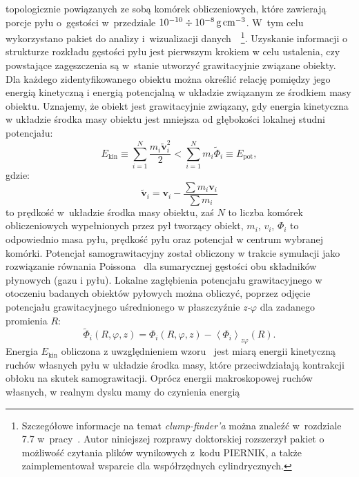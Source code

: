 topologicznie powiązanych ze sobą komórek obliczeniowych, które zawierają porcje
pyłu o~gęstości w~przedziale $10^{-10}\div10^{-8}\hbox{$\thinspace\textrm{g}$}\hbox{$\thinspace\textrm{cm}$}^{-3}$. W~tym celu
wykorzystano pakiet do analizy i~wizualizacji danych~\yt{}~\footnote{Szczegółowe
informacje na temat \emph{clump-finder'a} można znaleźć w~rozdziale 7.7
w~pracy~\cite{yt}. Autor niniejszej rozprawy doktorskiej rozszerzył pakiet
\yt{} o możliwość czytania plików wynikowych z~kodu PIERNIK, a także
zaimplementował wsparcie dla współrzędnych cylindrycznych.}.  Uzyskanie
informacji o strukturze rozkładu gęstości pyłu jest pierwszym krokiem w celu
ustalenia, czy powstające zagęszczenia są w~stanie utworzyć grawitacyjnie
związane obiekty. Dla każdego zidentyfikowanego obiektu można określić relację
pomiędzy jego energią kinetyczną i energią potencjalną w układzie związanym ze
środkiem masy obiektu. Uznajemy, że obiekt jest grawitacyjnie związany, gdy
energia kinetyczna w układzie środka masy obiektu jest mniejsza od głębokości
lokalnej studni potencjału:
%
\begin{equation}
   \label{eq:bcrit}
   E_{\textrm{kin}} \equiv \sum\limits_{i=1}^N \frac{m_i\tilde{\mathbf{v}}_i^2}{2} 
   < \sum\limits_{i=1}^N m_i\tilde{\Phi}_i \equiv E_{\textrm{pot}},
\end{equation}
%
gdzie:
\begin{equation}
   \tilde{\mathbf{v}}_i = \mathbf{v}_i - \frac{\sum m_i \mathbf{v}_i}{\sum m_i}
   \label{eq:velcom}
\end{equation}
to prędkość w~układzie środka masy obiektu, zaś $N$ to liczba komórek
obliczeniowych wypełnionych przez pył tworzący obiekt, $m_i$, $v_i$, $\Phi_i$ to
odpowiednio masa pyłu, prędkość pyłu oraz potencjał w centrum wybranej komórki. Potencjał
samograwitacyjny został obliczony w trakcie symulacji jako rozwiązanie
równania Poissona~ dla sumarycznej gęstości obu składników
płynowych (gazu i pyłu).  Lokalne zagłębienia potencjału grawitacyjnego w
otoczeniu badanych obiektów pyłowych można obliczyć, poprzez odjęcie potencjału
grawitacyjnego uśrednionego w płaszczyźnie \emph{z-$\varphi$} dla zadanego
promienia $R$:
%
\begin{equation}
   \tilde{\Phi}_i(R,\varphi,z) = \Phi_i(R,\varphi,z) -
   \left<\Phi_i\right>_{z\varphi}(R).
\end{equation}
%
Energia $E_{\textrm{kin}}$ obliczona z uwzględnieniem wzoru~
jest miarą energii kinetyczną ruchów własnych pyłu w układzie środka masy, które
przeciwdziałają kontrakcji obłoku na skutek samograwitacji.  Oprócz energii
makroskopowej ruchów własnych, w realnym dysku mamy do czynienia energią
